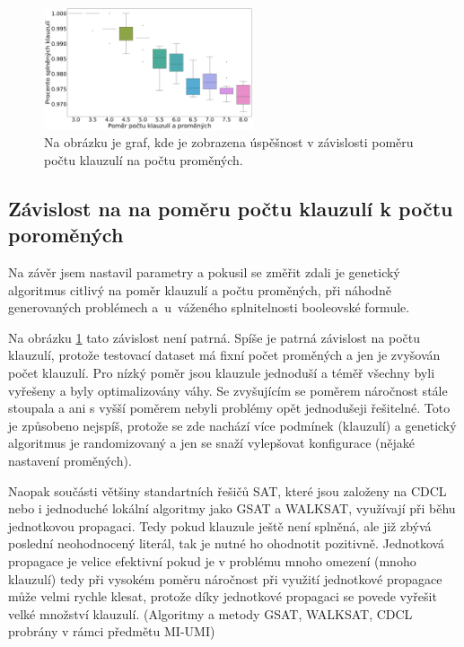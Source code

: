 \documentclass[11pt]{article}
\begin{document}
\begin{figure}
\begin{center}
\includegraphics[width=0.55\textwidth]{img/boxRatio.pdf} 
\caption{Na obrázku je graf, kde je zobrazena úspěšnost v závislosti poměru počtu klauzulí na počtu proměných.}
\label{fig:box}
\end{center}
\end{figure}

\pagebreak

\subsection{Závislost na na poměru počtu klauzulí k počtu poroměných}
Na závěr jsem nastavil parametry a pokusil se změřit zdali je genetický algoritmus citlivý na poměr klauzulí a počtu proměných, při náhodně generovaných problémech a~u~váženého splnitelnosti booleovské formule.

Na obrázku \ref{fig:box} tato závislost není patrná. Spíše je patrná závislost na počtu klauzulí, protože testovací dataset má fixní počet proměných a jen je zvyšován počet klauzulí. Pro nízký poměr jsou klauzule jednoduší a téměř všechny byli vyřešeny a byly optimalizovány váhy. Se zvyšujícím se poměrem náročnost stále stoupala a ani s vyšší poměrem nebyli problémy opět jednodušeji řešitelné. Toto je způsobeno nejspíš, protože se zde nachází více podmínek (klauzulí) a genetický algoritmus je randomizovaný a jen se snaží vylepšovat konfigurace (nějaké nastavení proměných).

Naopak součásti většiny standartních řešičů SAT, které jsou založeny na CDCL nebo i jednoduché lokální algoritmy jako GSAT a WALKSAT, využívají při běhu jednotkovou propagaci. Tedy pokud klauzule ještě není splněná, ale již zbývá poslední neohodnocený literál, tak je nutné ho ohodnotit pozitivně. Jednotková propagace je velice efektivní pokud je v problému mnoho omezení (mnoho klauzulí) tedy při vysokém poměru náročnost při využití jednotkové propagace může velmi rychle klesat, protože díky jednotkové propagaci se povede vyřešit velké množství klauzulí. (Algoritmy a metody GSAT, WALKSAT, CDCL probrány v rámci předmětu MI-UMI)
\end{document}

